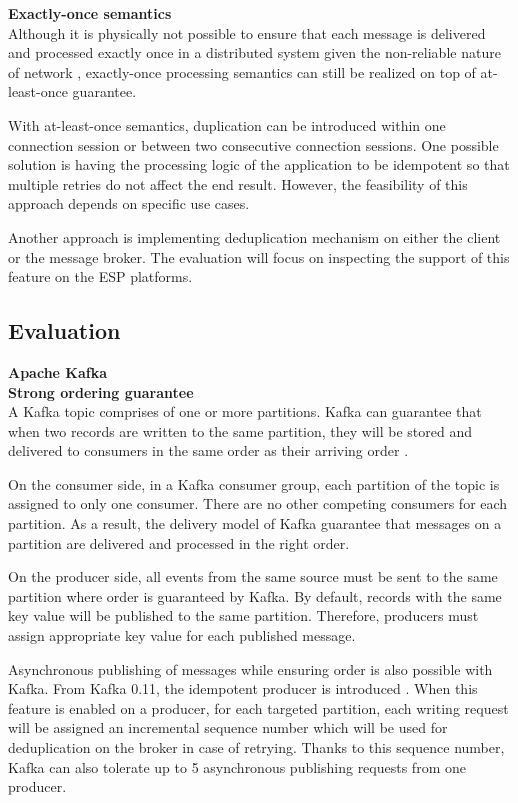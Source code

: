 \textbf{Exactly-once semantics}\\
Although it is physically not possible to ensure that each message is delivered and processed exactly once in a distributed system given the non-reliable nature of network \cite{exactlyoncenotpossible}, exactly-once processing semantics can still be realized on top of at-least-once guarantee. 

With at-least-once semantics, duplication can be introduced within one connection session or between two consecutive connection sessions. One possible solution is having the processing logic of the application to be idempotent so that multiple retries do not affect the end result. However, the feasibility of this approach depends on specific use cases.

Another approach is implementing deduplication mechanism on either the client or the message broker. The evaluation will focus on inspecting the support of this feature on the ESP platforms. 

\subsection{Evaluation}
\large \textbf{Apache Kafka}\\
\normalsize
\textbf{Strong ordering guarantee}\\
A Kafka topic comprises of one or more partitions. Kafka can guarantee that when two records are written to the same partition, they will be stored and delivered to consumers in the same order as their arriving order \cite{kafkaorderguarantee}.

On the consumer side, in a Kafka consumer group, each partition of the topic is assigned to only one consumer. There are no other competing consumers for each partition. As a result, the delivery model of Kafka guarantee that messages on a partition are delivered and processed in the right order.

On the producer side, all events from the same source must be sent to the same partition where order is guaranteed by Kafka. By default, records with the same key value will be published to the same partition. Therefore, producers must assign appropriate key value for each published message.

Asynchronous publishing of messages while ensuring order is also possible with Kafka. From Kafka 0.11, the idempotent producer is introduced \cite{kafkatransaction}. When this feature is enabled on a producer, for each targeted partition, each writing request will be assigned an incremental sequence number which will be used for deduplication on the broker in case of retrying. Thanks to this sequence number, Kafka can also tolerate up to 5 asynchronous publishing requests from one producer.

